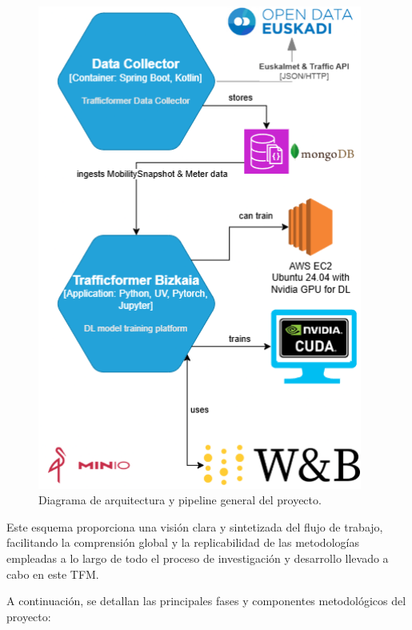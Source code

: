 \begin{figure}[H]
	\centering
	\includegraphics[width=0.95\textwidth]{includes/cap4/trafficformer_arch.png}
	\caption{Diagrama de arquitectura y pipeline general del proyecto.}
	\label{fig:pipeline-general}
\end{figure}

Este esquema proporciona una visión clara y sintetizada del flujo de trabajo, facilitando la comprensión global y la replicabilidad de las metodologías empleadas a lo largo de todo el proceso de investigación y desarrollo llevado a cabo en este TFM.

A continuación, se detallan las principales fases y componentes metodológicos del proyecto:

